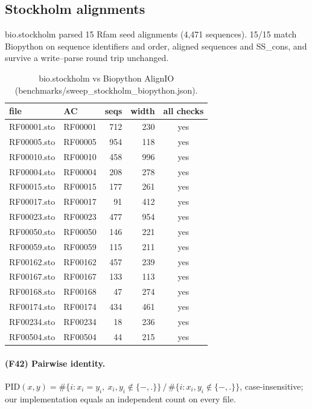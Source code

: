 \subsection{Stockholm alignments}
bio.stockholm parsed 15 Rfam seed alignments (4,471 sequences). 15/15 match Biopython on sequence identifiers and order, aligned sequences and SS\_cons, and survive a write--parse round trip unchanged.
\begin{table}[h]\centering\small\begin{tabular}{llrrc}\hline file & AC & seqs & width & all checks\\\hline
RF00001.sto & RF00001 & 712 & 230 & yes\\
RF00005.sto & RF00005 & 954 & 118 & yes\\
RF00010.sto & RF00010 & 458 & 996 & yes\\
RF00004.sto & RF00004 & 208 & 278 & yes\\
RF00015.sto & RF00015 & 177 & 261 & yes\\
RF00017.sto & RF00017 & 91 & 412 & yes\\
RF00023.sto & RF00023 & 477 & 954 & yes\\
RF00050.sto & RF00050 & 146 & 221 & yes\\
RF00059.sto & RF00059 & 115 & 211 & yes\\
RF00162.sto & RF00162 & 457 & 239 & yes\\
RF00167.sto & RF00167 & 133 & 113 & yes\\
RF00168.sto & RF00168 & 47 & 274 & yes\\
RF00174.sto & RF00174 & 434 & 461 & yes\\
RF00234.sto & RF00234 & 18 & 236 & yes\\
RF00504.sto & RF00504 & 44 & 215 & yes\\
\hline\end{tabular}\caption{bio.stockholm vs Biopython AlignIO (benchmarks/sweep\_stockholm\_biopython.json).}\end{table}
\paragraph{(F42) Pairwise identity.} $\mathrm{PID}(x,y)=\#\{i: x_i=y_i,\ x_i,y_i\notin\{-,.\}\}\,/\,\#\{i: x_i,y_i\notin\{-,.\}\}$, case-insensitive; our implementation equals an independent count on every file.

